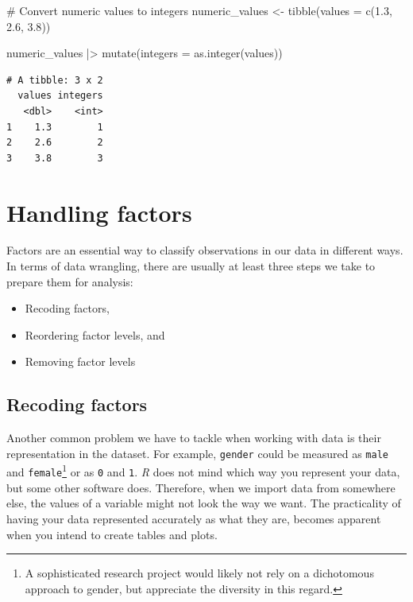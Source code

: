 \documentclass[
  letterpaper,
]{krantz}
\makeatletter
\newenvironment{Shaded}{\begin{snugshade}}{\end{snugshade}}
\newcommand{\AttributeTok}[1]{\textcolor[rgb]{0.40,0.45,0.13}{#1}}
\newcommand{\CommentTok}[1]{\textcolor[rgb]{0.37,0.37,0.37}{#1}}
\newcommand{\FloatTok}[1]{\textcolor[rgb]{0.68,0.00,0.00}{#1}}
\newcommand{\FunctionTok}[1]{\textcolor[rgb]{0.28,0.35,0.67}{#1}}
\newcommand{\NormalTok}[1]{\textcolor[rgb]{0.00,0.23,0.31}{#1}}
\newcommand{\OtherTok}[1]{\textcolor[rgb]{0.00,0.23,0.31}{#1}}
\newcommand{\SpecialCharTok}[1]{\textcolor[rgb]{0.37,0.37,0.37}{#1}}
\providecommand{\tightlist}{%
  \setlength{\itemsep}{0pt}\setlength{\parskip}{0pt}}\usepackage{longtable,booktabs,array}
\newenvironment{kframe}{%
\medskip{}
\setlength{\fboxsep}{.8em}
 \def\at@end@of@kframe{}%
 \ifinner\ifhmode%
  \def\at@end@of@kframe{\end{minipage}}%
  \begin{minipage}{\columnwidth}%
 \fi\fi%
 \def\FrameCommand##1{\hskip\@totalleftmargin \hskip-\fboxsep
 \colorbox{shadecolor}{##1}\hskip-\fboxsep
     \hskip-\linewidth \hskip-\@totalleftmargin \hskip\columnwidth}%
 \MakeFramed {\advance\hsize-\width
   \@totalleftmargin\z@ \linewidth\hsize
   \@setminipage}}%
 {\par\unskip\endMakeFramed%
 \at@end@of@kframe}
\renewenvironment{Shaded}{\begin{kframe}}{\end{kframe}}
\makeatother
\begin{document}
\begin{Shaded}
\begin{Highlighting}[]
\CommentTok{\# Convert numeric values to integers}
\NormalTok{numeric\_values }\OtherTok{\textless{}{-}} \FunctionTok{tibble}\NormalTok{(}\AttributeTok{values =} \FunctionTok{c}\NormalTok{(}\FloatTok{1.3}\NormalTok{, }\FloatTok{2.6}\NormalTok{, }\FloatTok{3.8}\NormalTok{))}

\NormalTok{numeric\_values }\SpecialCharTok{|\textgreater{}}
  \FunctionTok{mutate}\NormalTok{(}\AttributeTok{integers =} \FunctionTok{as.integer}\NormalTok{(values))}
\end{Highlighting}
\end{Shaded}

\begin{verbatim}
# A tibble: 3 x 2
  values integers
   <dbl>    <int>
1    1.3        1
2    2.6        2
3    3.8        3
\end{verbatim}

\section{Handling factors}\label{sec-handling-factors}

Factors are an essential way to classify observations in our data in
different ways. In terms of data wrangling, there are usually at least
three steps we take to prepare them for analysis:

\begin{itemize}
\tightlist
\item
  Recoding factors,
\item
  Reordering factor levels, and
\item
  Removing factor levels
\end{itemize}

\subsection{Recoding factors}\label{sec-recoding-factors}

Another common problem we have to tackle when working with data is their
representation in the dataset. For example, \texttt{gender} could be
measured as \texttt{male} and \texttt{female}\footnote{A sophisticated
  research project would likely not rely on a dichotomous approach to
  gender, but appreciate the diversity in this regard.} or as \texttt{0}
and \texttt{1}. \emph{R} does not mind which way you represent your
data, but some other software does. Therefore, when we import data from
somewhere else, the values of a variable might not look the way we want.
The practicality of having your data represented accurately as what they
are, becomes apparent when you intend to create tables and plots.
\end{document}
